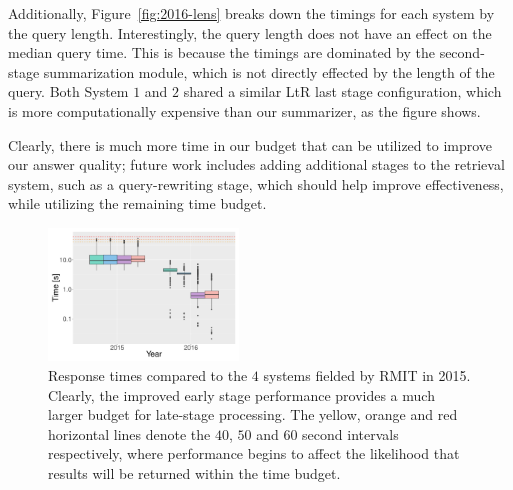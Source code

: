 \documentclass[a4paper,10pt,conference,compsocconf,final]{IEEEtran}
\newcommand\method[1]{{\sf\small{#1}}}
\begin{document}
Additionally, Figure~{\ref{fig:2016-lens}} breaks down the timings
for each system by the query length.
Interestingly, the query length does not have an effect on the median
query time.
This is because the timings are dominated by the second-stage
summarization module, which is not directly effected by the length of
the query.
Both System $1$ and $2$ shared a similar LtR last stage
configuration, which is more computationally expensive than our 
summarizer, as the figure shows.

Clearly, there is much more time in our budget that can be utilized
to improve our answer quality; future work includes adding
additional stages to the retrieval system, such as a query-rewriting
stage, which should help improve effectiveness, while utilizing the
remaining time budget.


\begin{figure}[t]
\centering
\includegraphics[width=0.45\textwidth]{liveqa-actual.pdf}
\caption{Response times compared to the $4$ systems fielded by
RMIT in 2015.
Clearly, the improved early stage performance provides a much larger
budget for late-stage processing.
The yellow, orange and red horizontal lines denote the $40$, $50$ and
$60$ second intervals respectively, where performance begins to
affect the likelihood that results will be returned within the time
budget.}
\label{fig:2016-times}
\end{figure}
\end{document}
